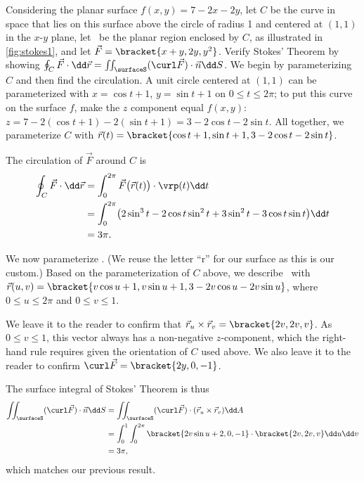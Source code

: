 \begin{example}\label{ex_stokes1}%
Considering the planar surface $f(x,y) = 7-2x-2y$, let $C$ be the curve in space that lies on this surface above the circle of radius 1 and centered at $(1,1)$ in the $x$-$y$ plane, let \surfaceS\ be the planar region enclosed by $C$, as illustrated in \autoref{fig:stokes1}, and let $\vec F =\bracket{x+y,2y, y^2}$. Verify Stokes' Theorem by showing $\oint_C \vec F\cdot\dd\vec r = \iint_{\surfaceS} (\curl\vec F)\cdot \vec n\dd S$.
\solution
We begin by parameterizing $C$ and then find the circulation. A unit circle centered at $(1,1)$ can be parameterized with $x=\cos t+1$, $y=\sin t+1$ on $0\leq t\leq 2\pi$; to put this curve on the surface $f$, make the $z$ component equal $f(x,y)$: $z = 7-2(\cos t+1)-2(\sin t+1)  = 3-2\cos t - 2\sin t$. All together, we parameterize $C$ with $\vec r(t) =\bracket{\cos t+1, \sin t+1, 3-2\cos t-2\sin t}$. 

The circulation of $\vec F$ around $C$ is
\begin{align*}
	\oint_C\vec F\cdot\dd\vec r
	&= \int_0^{2\pi}\vec F\bigl(\vec r(t)\bigr)\cdot \vrp(t)\dd t \\
	&= \int_0^{2\pi}\bigl(2\sin^3t-2\cos t\sin^2t+3\sin^2t-3\cos t\sin t\bigr)\dd t \\
	&= 3\pi.
\end{align*}

We now parameterize \surfaceS. (We reuse the letter ``r'' for our surface as this is our custom.) Based on the parameterization of $C$ above, we describe \surfaceS\ with $\vec r(u,v) =\bracket{v\cos u+1, v\sin u+1, 3-2v\cos u-2v\sin u}$, where $0\leq u\leq 2\pi$ and $0\leq v\leq 1$. 

We leave it to the reader to confirm that $\vec r_u\times \vec r_v =\bracket{2v,2v,v}$. As $0\leq v\leq 1$, this vector always has a non-negative $z$-component, which the right-hand rule requires given the orientation of $C$ used above. We also leave it to the reader to confirm $\curl\vec F =\bracket{2y,0,-1}$.

The surface integral of Stokes' Theorem is thus
\begin{align*}
	\iint_{\surfaceS} (\curl\vec F)\cdot \vec n\dd S
	&= \iint_{\surfaceS} (\curl\vec F)\cdot (\vec r_u\times \vec r_v)\dd A \\
	&= \int_0^1\int_0^{2\pi}\bracket{2v\sin u+2,0,-1}\cdot\bracket{2v,2v,v}\dd u\dd v\\
	&= 3\pi,
\end{align*}
which matches our previous result.
\end{example}

